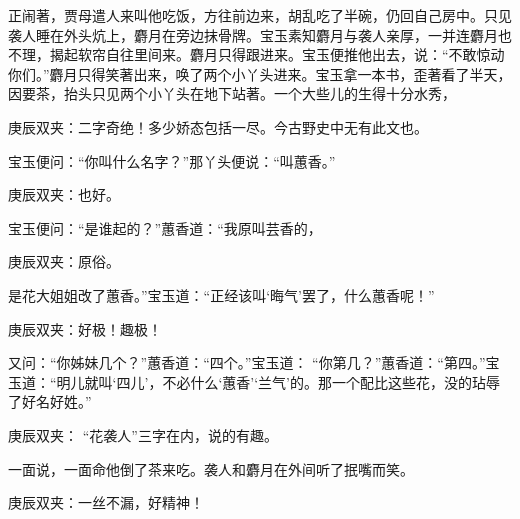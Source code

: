 \begin{parag}
    正闹著，贾母遣人来叫他吃饭，方往前边来，胡乱吃了半碗，仍回自己房中。只见袭人睡在外头炕上，麝月在旁边抹骨牌。宝玉素知麝月与袭人亲厚，一并连麝月也不理，揭起软帘自往里间来。麝月只得跟进来。宝玉便推他出去，说：“不敢惊动你们。”麝月只得笑著出来，唤了两个小丫头进来。宝玉拿一本书，歪著看了半天，因要茶，抬头只见两个小丫头在地下站著。一个大些儿的生得十分水秀，\begin{note}庚辰双夹：二字奇绝！多少娇态包括一尽。今古野史中无有此文也。\end{note}宝玉便问：“你叫什么名字？”那丫头便说：“叫蕙香。”\begin{note}庚辰双夹：也好。\end{note}宝玉便问：“是谁起的？”蕙香道：“我原叫芸香的，\begin{note}庚辰双夹：原俗。\end{note}是花大姐姐改了蕙香。”宝玉道：“正经该叫‘晦气’罢了，什么蕙香呢！”\begin{note}庚辰双夹：好极！趣极！\end{note}又问：“你姊妹几个？”蕙香道：“四个。”宝玉道： “你第几？”蕙香道：“第四。”宝玉道：“明儿就叫‘四儿’，不必什么‘蕙香’‘兰气’的。那一个配比这些花，没的玷辱了好名好姓。”\begin{note}庚辰双夹： “花袭人”三字在内，说的有趣。\end{note}一面说，一面命他倒了茶来吃。袭人和麝月在外间听了抿嘴而笑。\begin{note}庚辰双夹：一丝不漏，好精神！\end{note}
\end{parag}


